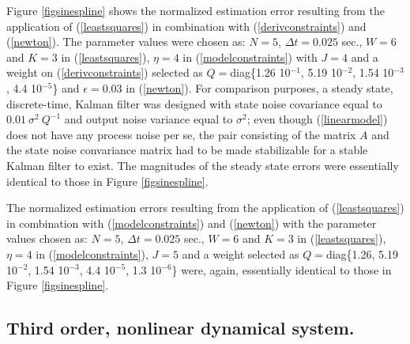 Figure \ref{figsinespline} shows the normalized estimation error resulting
from the application of (\ref{leastsquares})  in combination with
(\ref{derivconstraints})
and (\ref{newton}).   The parameter values were chosen as: $N=5$,
 $\Delta t = 0.025$ sec., $W=6$ and $K=3$  in (\ref{leastsquares}), 
$\eta = 4$ in (\ref{modelconstraints}) with $J=4$ and
a weight on (\ref{derivconstraints}) selected as
$Q =$diag\{1.26 10$^{-1}$, 5.19 10$^{-2}$, 1.54 10$^{-3}$, 4.4 10$^{-5}$\}
and $\epsilon = 0.03$ in (\ref{newton}).   
For comparison purposes,
a steady state, discrete-time, Kalman filter was designed with 
state noise covariance equal to 
$0.01 \ \sigma^2 \ Q^{-1}$ and output noise variance equal to $\sigma^2$; even
though (\ref{linearmodel}) does not have any process noise per se, the pair
consisting of the matrix $A$ and the state noise convariance matrix
had to be made stabilizable
for a stable Kalman filter to exist.
The magnitudes of the steady state errors were essentially identical to those in 
Figure \ref{figsinespline}.




The normalized estimation errors resulting
from the application of (\ref{leastsquares}) in combination with
(\ref{modelconstraints})
and (\ref{newton}) 
with  the parameter values chosen as: $N=5$, 
$\Delta t = 0.025$
sec., $W=6$ and $K=3$  in (\ref{leastsquares}), $\eta = 4$ in
(\ref{modelconstraints}), 
$J=5$ and a weight selected as
$ Q =$diag\{1.26, 5.19 10$^{-2}$, 1.54 10$^{-3}$, 4.4 10$^{-5}$, 1.3 10$^{-6}$\}
were, 
again, essentially identical to those in 
Figure \ref{figsinespline}.


\subsection{Third order, nonlinear dynamical system.}

